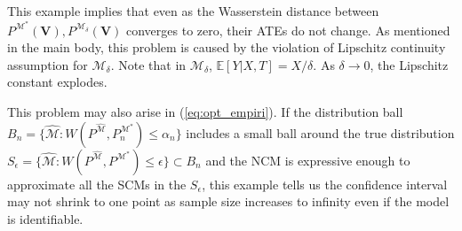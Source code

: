 This example implies that even as the Wasserstein distance between $ P^{\mathcal{M}^*}(\boldsymbol{V}) ,P^{\mathcal{M}_{\delta }}(\boldsymbol{V}) $ converges to zero, their ATEs do not change. As mentioned in the main body, this problem is caused by the violation of Lipschitz continuity assumption for $\mathcal{M}_\delta$. Note that in $ \mathcal{M}_{\delta }$, $ \mathbb{E}[ Y|X,T] =X/\delta $. As $ \delta \rightarrow 0$, the Lipschitz constant explodes. 

This problem may also arise in (\ref{eq:opt_empiri}). If the distribution ball $ B_{n} =\{\hat{\mathcal{M}} :W( P^{\hat{\mathcal{M}}} ,P^{\mathcal{M}^*}_{n}) \leqslant \alpha _{n}\}$ includes a small ball around the true distribution $ S_{\epsilon } =\{\hat{\mathcal{M}} :W( P^{\hat{\mathcal{M}}} ,P^{\mathcal{M}^*}) \leqslant \epsilon \} \subset B_{n}$ and the NCM is expressive enough to approximate all the SCMs in the $S_\epsilon$, this example tells us the confidence interval may not shrink to one point as sample size increases to infinity even if the model is identifiable.  


